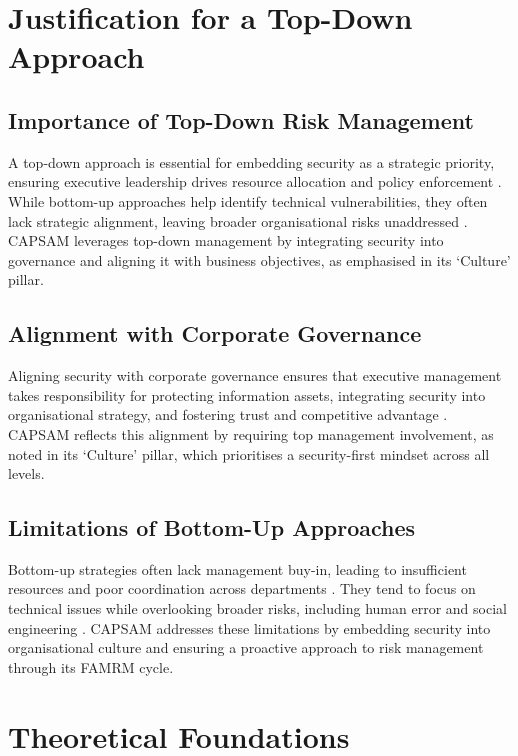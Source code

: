 \section{Justification for a Top-Down Approach}
    \subsection{Importance of Top-Down Risk Management}
    A top-down approach is essential for embedding security as a strategic priority, ensuring executive leadership drives resource allocation and policy enforcement \citep{linkov2014risk, fazlida2015information}. While bottom-up approaches help identify technical vulnerabilities, they often lack strategic alignment, leaving broader organisational risks unaddressed \citep{linkov2014risk}. CAPSAM leverages top-down management by integrating security into governance and aligning it with business objectives, as emphasised in its `Culture' pillar.

    \subsection{Alignment with Corporate Governance}
    Aligning security with corporate governance ensures that executive management takes responsibility for protecting information assets, integrating security into organisational strategy, and fostering trust and competitive advantage \citep{fazlida2015information}. CAPSAM reflects this alignment by requiring top management involvement, as noted in its `Culture' pillar, which prioritises a security-first mindset across all levels.

    \subsection{Limitations of Bottom-Up Approaches}
    Bottom-up strategies often lack management buy-in, leading to insufficient resources and poor coordination across departments \citep{fazlida2015information, shedden2010information}. They tend to focus on technical issues while overlooking broader risks, including human error and social engineering \citep{shaikh2023information, cai2017cybersecurity}. CAPSAM addresses these limitations by embedding security into organisational culture and ensuring a proactive approach to risk management through its FAMRM cycle.

\section{Theoretical Foundations}
